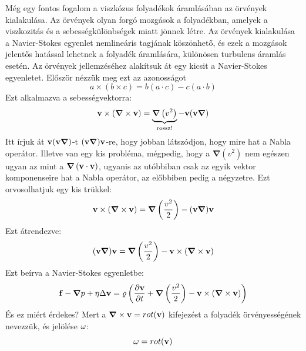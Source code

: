 \documentclass[../main.tex]{subfiles}
\begin{document}
Még egy fontos fogalom a viszkózus folyadékok áramlásában az örvények kialakulása. Az örvények olyan forgó mozgások a folyadékban, amelyek a viszkozitás és a sebességkülönbségek miatt jönnek létre.
Az örvények kialakulása a Navier-Stokes egyenlet nemlineáris tagjának köszönhető, és ezek a mozgások jelentős hatással lehetnek a folyadék áramlására, különösen turbulens áramlás esetén.
Az örvények jellemzéséhez alakítsuk át egy kicsit a Navier-Stokes egyenletet. Először nézzük meg ezt az azonosságot
\begin{equation}
    a \times (b \times c) = b(a \cdot c) - c(a \cdot b)
\end{equation}
Ezt alkalmazva a sebességvektorra:
\begin{equation}
    \bold{v} \times (\boldsymbol{\nabla} \times \bold{v}) = \underbrace{\boldsymbol{\nabla} \left(v^2\right)}_{\text{rossz!}} - \bold{v} (\bold{v} \boldsymbol{\nabla})
\end{equation}
Itt írjuk át $\bold{v} (\bold{v} \boldsymbol{\nabla})$-t $(\bold{v} \boldsymbol{\nabla})\bold{v}$-re, hogy jobban látszódjon, hogy mire hat a Nabla operátor. Illetve van egy kis probléma,
mégpedig, hogy a $\boldsymbol{\nabla} \left(v^2\right)$ nem egészen ugyan az mint a $\boldsymbol{\nabla} \left(\bold{v} \cdot \bold{v}\right)$, ugyanis az utóbbiban csak az egyik vektor komponenseire hat a Nabla operátor,
az előbbiben pedig a négyzetre. Ezt orvosolhatjuk egy kis trükkel:
\begin{equation}
    \bold{v} \times (\boldsymbol{\nabla} \times \bold{v}) = \boldsymbol{\nabla} \left(\frac{v^2}{2}\right) - (\bold{v} \boldsymbol{\nabla})\bold{v}
\end{equation}
Ezt átrendezve:
\begin{equation}
    (\bold{v} \boldsymbol{\nabla})\bold{v} = \boldsymbol{\nabla} \left(\frac{v^2}{2}\right) - \bold{v} \times (\boldsymbol{\nabla} \times \bold{v})
\end{equation}
Ezt beírva a Navier-Stokes egyenletbe:
\begin{equation}
    \bold{f} - \boldsymbol{\nabla} p + \eta \Delta \bold{v} = \varrho \left(\frac{\partial \bold{v}}{\partial t} + \boldsymbol{\nabla} \left(\frac{v^2}{2}\right) - \bold{v} \times (\boldsymbol{\nabla} \times \bold{v})\right)
\end{equation}
És ez miért érdekes? Mert a $\boldsymbol{\nabla} \times \bold{v} = rot(\bold{v})$ kifejezést a folyadék örvényességének nevezzük, és jelölése $\bold{\omega}$:
\begin{equation}
    \bold{\omega} = rot(\bold{v})
\end{equation}
\end{document}
